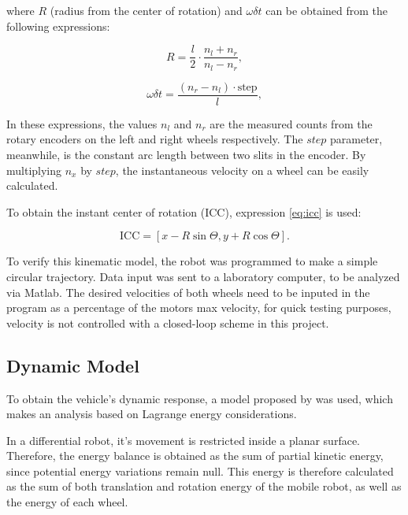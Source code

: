 \documentclass[a4paper]{aadeca}
\begin{document}
where $R$ (radius from the center of rotation) and $\omega\delta t$ can be obtained from the following expressions:

\begin{equation}
R = \frac{l}{2}\cdot\frac{n_l + n_r}{n_l - n_r},
\label{radio}
\end{equation}

\begin{equation}
\omega\delta t=\frac{\left(n_r - n_l\right)\cdot\text{step}}{l},
\label{omega}
\end{equation}

In these expressions, the values $n_l$ and $n_r$ are the measured counts from the rotary encoders on the left and right wheels respectively.
The $step$ parameter, meanwhile, is the constant arc length between two slits in the encoder.
By multiplying $n_x$ by $step$, the instantaneous velocity on a wheel can be easily calculated.

To obtain the instant center of rotation (ICC), expression \ref{eq:icc} is used:

\begin{equation}
\label{eq:icc}
\text{ICC}=\left[x-R\sin\Theta , y+R\cos\Theta\right].
\end{equation}

To verify this kinematic model, the robot was programmed to make a simple circular trajectory.
Data input was sent to a laboratory computer, to be analyzed via Matlab.
The desired velocities of both wheels need to be inputed in the program as a percentage of the motors max velocity, for quick testing purposes, velocity is not controlled with a closed-loop scheme in this project. 

\subsection{Dynamic Model}

To obtain the vehicle's dynamic response, a model proposed by \cite{ivanjko_modelling_2010} was used, which makes an analysis based on Lagrange energy considerations.

In a differential robot, it's movement is restricted inside a planar surface.
Therefore, the energy balance is obtained as the sum of partial kinetic energy, since potential energy variations remain null.
This energy is therefore calculated as the sum of both translation and rotation energy of the mobile robot, as well as the energy of each wheel.
\end{document}
